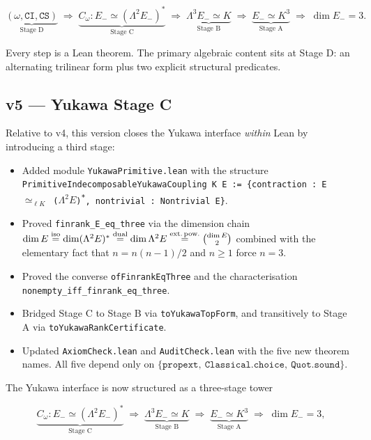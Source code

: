 \[
\underbrace{(\omega, \texttt{CI}, \texttt{CS})}_{\text{Stage D}}
\;\Rightarrow\;
\underbrace{C_\omega : E_- \simeq (\Lambda^2 E_-)^*}_{\text{Stage C}}
\;\Rightarrow\;
\underbrace{\Lambda^3 E_- \simeq K}_{\text{Stage B}}
\;\Rightarrow\;
\underbrace{E_- \simeq K^3}_{\text{Stage A}}
\;\Rightarrow\;
\dim E_- = 3.
\]

Every step is a Lean theorem. The primary algebraic content
sits at Stage D: an alternating trilinear form plus two
explicit structural predicates.

\subsection*{v5 --- Yukawa Stage C}

Relative to v4, this version closes the Yukawa interface
\emph{within} Lean by introducing a third stage:

\begin{itemize}[leftmargin=1.6em, itemsep=2pt]
\item Added module \texttt{YukawaPrimitive.lean} with the
    structure
    \texttt{PrimitiveIndecomposableYukawaCoupling K E := \{contraction : E $\simeq_{\ell K}$ ($\Lambda^2 E$)\textsuperscript{*}, nontrivial : Nontrivial E\}}.
\item Proved \texttt{finrank\_E\_eq\_three} via the dimension
    chain
    $\dim E \overset{\text{iso}}{=} \dim (\Lambda^2 E)^*
    \overset{\text{dual}}{=} \dim \Lambda^2 E
    \overset{\text{ext.\,pow.}}{=} \binom{\dim E}{2}$
    combined with the elementary fact that $n = n(n-1)/2$ and
    $n \ge 1$ force $n = 3$.
\item Proved the converse \texttt{ofFinrankEqThree} and the
    characterisation \texttt{nonempty\_iff\_finrank\_eq\_three}.
\item Bridged Stage C to Stage B via \texttt{toYukawaTopForm}, and
    transitively to Stage A via \texttt{toYukawaRankCertificate}.
\item Updated \texttt{AxiomCheck.lean} and \texttt{AuditCheck.lean}
    with the five new theorem names. All five depend only on
    $\{\texttt{propext},\ \texttt{Classical.choice},\
    \texttt{Quot.sound}\}$.
\end{itemize}

\smallskip
The Yukawa interface is now structured as a three-stage tower

\[
\underbrace{C_\omega : E_- \simeq (\Lambda^2 E_-)^*}_{\text{Stage C}}
\;\Rightarrow\;
\underbrace{\Lambda^3 E_- \simeq K}_{\text{Stage B}}
\;\Rightarrow\;
\underbrace{E_- \simeq K^3}_{\text{Stage A}}
\;\Rightarrow\;
\dim E_- = 3,
\]

